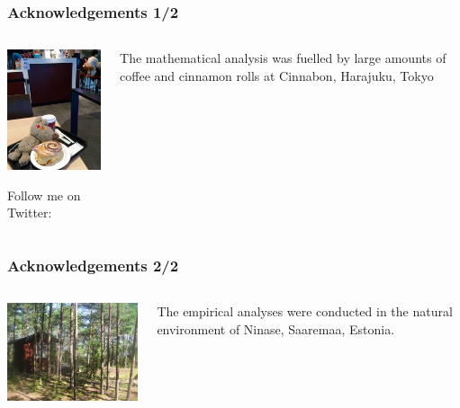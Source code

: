 \documentclass[t]{beamer} %
\begin{document}
\begin{frame}
  \frametitle{Acknowledgements 1/2}

  \ungap[1]
  \begin{columns}[T]
    \begin{column}{55mm}
      \includegraphics[width=52mm]{img/ratti_cinnamon_rolls}
      
      \scriptsize
      Follow me on Twitter: 
    \end{column}
    \begin{column}{50mm}
      The mathematical analysis was fuelled by large amounts of coffee and cinnamon rolls at Cinnabon, Harajuku, Tokyo

    \end{column}

  \end{columns}
\end{frame}

\begin{frame}
  \frametitle{Acknowledgements 2/2}

  \ungap[1]
  \begin{columns}[T]
    \begin{column}{70mm}
      \includegraphics[width=68mm]{img/Cottage_on_Saaremaa}
    \end{column}
    \begin{column}{40mm}
      The empirical analyses were conducted in the natural environment of Ninase, Saaremaa, Estonia.
    \end{column}

  \end{columns}
\end{frame}



\end{document}
